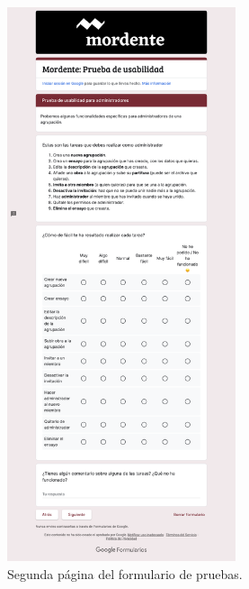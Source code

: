 \begin{figure}[h]
\centering
\includegraphics[width=0.6\textwidth]{imagenes/pruebas/form_2.png}
\caption{Segunda página del formulario de pruebas.}
\label{fig:form2}
\end{figure}

